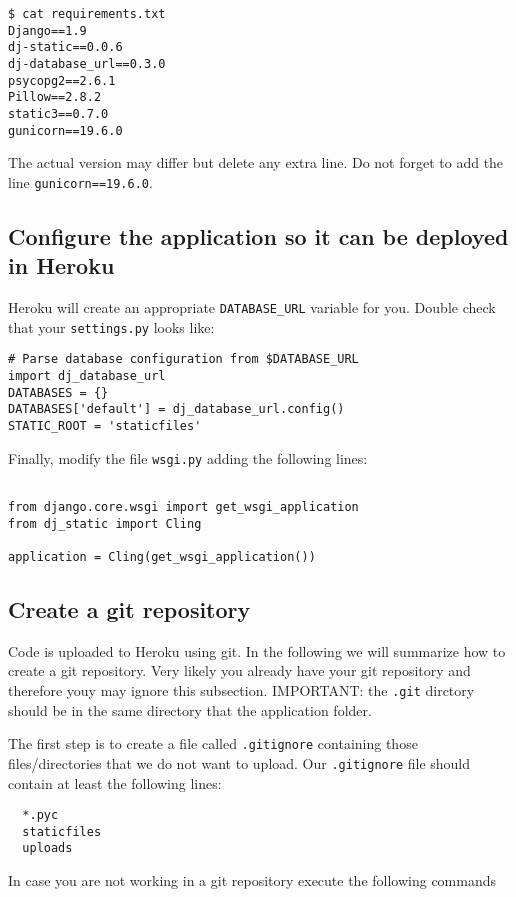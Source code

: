 \documentclass[12pt]{article} %
\begin{document}
\begin{verbatim}
$ cat requirements.txt 
Django==1.9
dj-static==0.0.6
dj-database_url==0.3.0
psycopg2==2.6.1
Pillow==2.8.2
static3==0.7.0
gunicorn==19.6.0
\end{verbatim}
The actual version may differ but delete any extra line. Do not forget to add the line \texttt{gunicorn==19.6.0}.

\subsection{Configure the application so it can be deployed in Heroku}
Heroku will create an appropriate \texttt{DATABASE\_URL} variable for you. Double check that your \texttt{settings.py} looks like:

\footnotesize
\begin{verbatim}
# Parse database configuration from $DATABASE_URL
import dj_database_url
DATABASES = {} 
DATABASES['default'] = dj_database_url.config()
STATIC_ROOT = 'staticfiles'
\end{verbatim}
\normalfont

Finally, modify the file \texttt{wsgi.py} adding the following lines:
\begin{verbatim}
 
from django.core.wsgi import get_wsgi_application
from dj_static import Cling
 
application = Cling(get_wsgi_application())
\end{verbatim}


\subsection{Create a git repository}
Code is uploaded to Heroku using git. In the following we will summarize how to create a git repository. Very likely you already have your git repository and therefore youy may ignore this subsection. IMPORTANT: the \texttt{.git} dirctory should be in the same directory that the application folder.

The first step is to create a file called \texttt{.gitignore} containing those files/directories 
that we do not want to upload. Our \texttt{.gitignore} file should contain at least the following lines:

\begin{verbatim}
  *.pyc
  staticfiles
  uploads
\end{verbatim}

In case you are not working in a git repository execute the following commands
\end{document}
